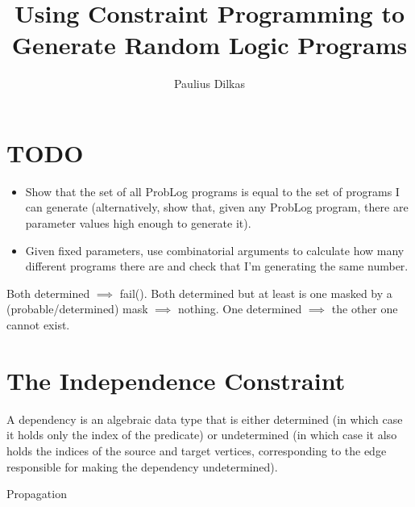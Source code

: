 \documentclass{article}
\author{Paulius Dilkas}
\title{Using Constraint Programming to Generate Random Logic Programs}
\begin{document}
\maketitle

\section{TODO}

\begin{itemize}
\item Show that the set of all ProbLog programs is equal to the set of programs
  I can generate (alternatively, show that, given any ProbLog program, there are
  parameter values high enough to generate it).
\item Given fixed parameters, use combinatorial arguments to calculate how many
  different programs there are and check that I'm generating the same number.
\end{itemize}

Both determined $\implies$ fail(). Both determined but at least is one masked by
a (probable/determined) mask $\implies$ nothing. One determined $\implies$ the
other one cannot exist.

\section{The Independence Constraint}

A dependency is an algebraic data type that is either determined (in which case
it holds only the index of the predicate) or undetermined (in which case it also
holds the indices of the source and target vertices, corresponding to the edge
responsible for making the dependency undetermined).

\begin{algorithm}
  \caption{Propagation}
\end{algorithm}
\end{document}
